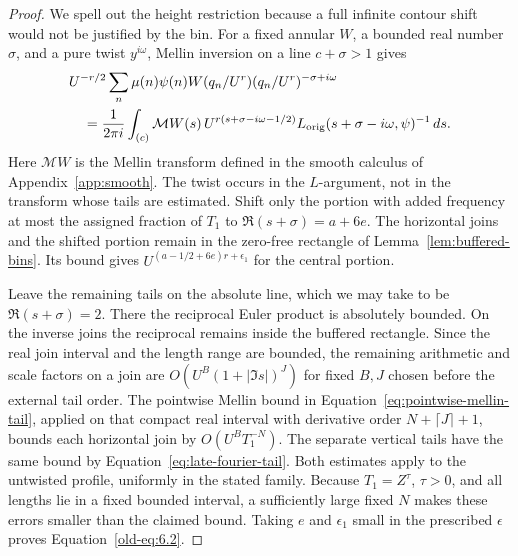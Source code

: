 \documentclass[12pt]{article}
\begin{document}
\begin{proof}
We spell out the height restriction because a full infinite contour
shift would not be justified by the bin.  For a fixed annular \(W\),
a bounded real number \(\sigma\), and a pure twist \(y^{i\omega}\),
Mellin inversion on a line \(c+\sigma>1\) gives
\[
 \begin{split}
 &U^{-r/2}\sum_n\mu(n)\psi(n)
       W(q_n/U^r)(q_n/U^r)^{-\sigma+i\omega}\\
 &\quad=\frac1{2\pi i}\int_{(c)}
  \mathcal MW(s)\,
  U^{r(s+\sigma-i\omega-1/2)}
  L_{\rm orig}(s+\sigma-i\omega,\psi)^{-1}\,ds.
 \end{split}
\]
Here \(\mathcal MW\) is the Mellin transform defined in
the smooth calculus of Appendix~\ref{app:smooth}.  The twist occurs in the
\(L\)-argument, not in the transform whose tails are estimated.
Shift only the portion with added frequency at most the assigned
fraction of \(T_1\) to \(\Re(s+\sigma)=a+6e\).
The horizontal joins and the shifted portion remain in the
zero-free rectangle of Lemma~\ref{lem:buffered-bins}.  Its bound
gives \(U^{(a-1/2+6e)r+\epsilon_1}\) for the central portion.

Leave the remaining tails on the absolute line, which we may take
to be \(\Re(s+\sigma)=2\).  There the reciprocal Euler product is
absolutely bounded.  On the inverse joins the reciprocal remains
inside the buffered rectangle.  Since the real join interval and
the length range are bounded, the remaining arithmetic and scale
factors on a join are \(O(U^B(1+|\Im s|)^J)\) for fixed \(B,J\)
chosen before the external tail order.  The pointwise Mellin bound
in Equation~\eqref{eq:pointwise-mellin-tail}, applied on that compact
real interval with derivative order \(N+\lceil J\rceil+1\), bounds
each horizontal join by \(O(U^B T_1^{-N})\).  The separate vertical
tails have the same bound by Equation~\eqref{eq:late-fourier-tail}.
Both estimates apply to the untwisted profile, uniformly in the
stated family.  Because \(T_1=Z^\tau\), \(\tau>0\), and all lengths
lie in a fixed bounded interval, a sufficiently large fixed \(N\)
makes these errors smaller than the claimed bound.
Taking \(e\) and \(\epsilon_1\) small in the prescribed
\(\epsilon\) proves Equation~\eqref{old-eq:6.2}.


\end{proof}
\end{document}
